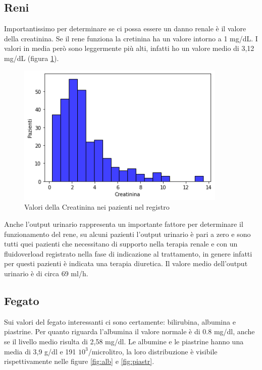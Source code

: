 \subsection{Reni}

Importantissimo per determinare se ci possa essere un danno renale è il valore della creatinina.
Se il rene funziona la cretinina ha un valore  intorno a 1 mg/dL.
I valori in media però sono leggermente più alti, infatti ho un valore medio di 3,12 mg/dL (figura \ref{fig:crea}).

\begin{figure}[h] 
	\centering
	\includegraphics[width=10cm]{capitolo1/crea.png}
	\caption{Valori della Creatinina nei pazienti nel registro}
	\label{fig:crea}
\end{figure}

Anche l'output urinario rappresenta un importante fattore per determinare il funzionamento del rene, su alcuni pazienti l'output urinario è pari a zero e sono tutti quei pazienti che necessitano di supporto nella terapia renale e con un fluidoverload registrato nella fase di indicazione al trattamento, in genere infatti per questi pazienti è indicata una terapia diuretica. Il valore medio dell'output urinario è di circa 69 ml/h.
 
\subsection{Fegato}
Sui valori del fegato interessanti ci sono certamente: bilirubina, albumina e piastrine.
Per quanto riguarda l'albumina il valore normale è di 0.8 mg/dl, anche se il livello medio risulta di 2,58 mg/dl.
Le albumine e le piastrine hanno una media di 3,9 g/dl e 191 $10^3$/microlitro, la loro distribuzione è visibile rispettivamente nelle figure \ref{fig:alb} e \ref{fig:piastr}.

